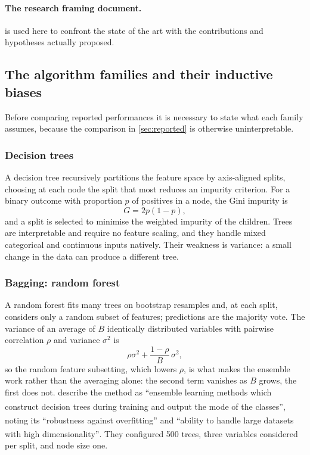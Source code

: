 \documentclass[12pt,a4paper,oneside]{report}
\newcommand{\bq}[1]{``#1''\textsuperscript{\dag}}
\begin{document}
\paragraph{The research framing document.} \textcite{cadrage2026} is used here to confront the state of the art with the contributions and hypotheses actually proposed.

\subsection{The algorithm families and their inductive biases}\label{sec:families}

Before comparing reported performances it is necessary to state what each family assumes, because the comparison in \cref{sec:reported} is otherwise uninterpretable.

\subsubsection{Decision trees}

A decision tree recursively partitions the feature space by axis-aligned splits, choosing at each node the split that most reduces an impurity criterion. For a binary outcome with proportion $p$ of positives in a node, the Gini impurity is
\begin{equation}
  G = 2p(1-p),
\end{equation}
and a split is selected to minimise the weighted impurity of the children. Trees are interpretable and require no feature scaling, and they handle mixed categorical and continuous inputs natively. Their weakness is variance: a small change in the data can produce a different tree.

\subsubsection{Bagging: random forest}

A random forest fits many trees on bootstrap resamples and, at each split, considers only a random subset of features; predictions are the majority vote. The variance of an average of $B$ identically distributed variables with pairwise correlation $\rho$ and variance $\sigma^2$ is
\begin{equation}
  \rho\sigma^2 + \frac{1-\rho}{B}\,\sigma^2,
\end{equation}
so the random feature subsetting, which lowers $\rho$, is what makes the ensemble work rather than the averaging alone: the second term vanishes as $B$ grows, the first does not. \Textcite{mendoza2025} describe the method as \bq{ensemble learning methods which construct decision trees during training and output the mode of the classes}, noting its \bq{robustness against overfitting} and \bq{ability to handle large datasets with high dimensionality}. They configured 500 trees, three variables considered per split, and node size one.
\end{document}
